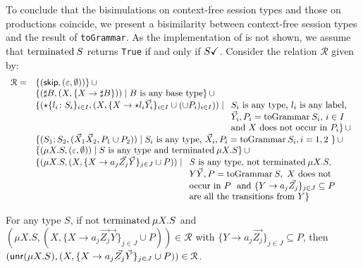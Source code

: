 To conclude that the bisimulations on context-free session types and
those on productions coincide, we present a bisimilarity between
context-free session types and the result of \lstinline|toGrammar|.
%
As the implementation of \isCheckedf is not shown, we assume that
$\isCheckedf S$ returns \lstinline|True| if and only if $S\checkmark$.
%
Consider the relation $\mathcal{R}$ given by:
\[\begin{array}{lll}
	\mathcal{R} = & \{ (\skipk, (\varepsilon, \emptyset))\} \,\cup\\
	& \{(\sharp B,(X,\{X \rightarrow \sharp B\})) \mid \text{$B$ is any base type}\} 
	   \,\cup\\
	& \{ (\star\{l_i\colon S_i\}_{i\in I}, (X, \{X \rightarrow \star l_i
    \vec Y_i\}_{i\in I} \cup (\cup  P_i)_{i\in I})) \mid 
    \begin{array}[t]{l}
    	\text{$S_i$ is any type, $l_i$ is any label,}\\
    	\text{$\vec Y_i, P_i = \toGrammarf{S_i}$, $i \in I$ }\\
    	\text{and $X$ does not occur in $P_i$}\} \,\cup\\
    \end{array}\\
    &\{(S_1;S_2, (\vec X_1\vec X_2,  P_1 \cup  P_2)) \mid
    \text{$S_i$ is any type, $\vec X_i, P_i = \toGrammarf{S_i}, i = 1,2$ } \}\,\cup\\
    & \{(\mu X.S, (\varepsilon, \emptyset)) \mid 
    \text{$S$ is any type and $\isCheckedf \mu X.S$}\}\,\cup\\
    & \{(\mu X.S, (X, \{X \rightarrow a_j \vec {Z_j}\vec Y\}_{j\in J} \cup  P)) \mid 
    \begin{array}[t]{l}
      \text{$S$ is any type, not } \isCheckedf \mu X.S,\\
      Y\vec Y, P = \toGrammarf{S}, \text{ $X$ does not}\\
      \text{occur in $P$ }\text{ and } \{Y \rightarrow a_j \vec {Z_j}\}_{j\in J} 
      \subseteq  P\\
      \text{are all the transitions from $Y$}\}
    \end{array}\\
\end{array}\]

\begin{lemma}
\label{lemma:bisim_unr}
	For any type $S$, if not $\isCheckedf \mu X.S$ and 
	$(\mu X.S, (X, \{X \rightarrow a_j \vec {Z_j}\vec Y\}_{j\in J} \cup  P))\in \mathcal{R}$
	with $\{Y \rightarrow a_j \vec {Z_j}\}_{j\in J}\subseteq P$, then
	$(\mathsf{unr}(\mu X.S), (X, \{X \rightarrow a_j \vec {Z_j}\vec Y\}_{j\in J} \cup  P))
	\in \mathcal{R}$.
\end{lemma}

